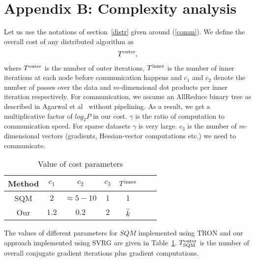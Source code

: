 \def\C{C}
\def\Ccomp{C^{\rm Comp}}
\def\Ccomm{C^{\rm Comm}}
\def\Csqm{C_{\rm SQM}}
\def\Csvrg{C_{\rm SVRG}}
\def\Ccompsqm{C^{\rm Comp}_{\rm SQM}}
\def\Ccommsqm{C^{\rm Comm}_{\rm SQM}}
\def\Ccompsvrg{C^{\rm Comp}_{\rm SVRG}}
\def\Ccommsvrg{C^{\rm Comm}_{\rm SVRG}}
\def\Tout{T^{\rm outer}}
\def\Tin{T^{\rm inner}}
\def\Toutsqm{T^{\rm outer}_{\rm SQM}}
\def\Toutsvrg{T^{\rm outer}_{\rm SVRG}}

\section{Appendix B: Complexity analysis}
\label{proofs}
Let us use the notations of section~\ref{distr} given around (\ref{comm}). We define the overall cost of any distributed algorithm as
\begin{eqnarray}
[(c_1\frac{nz}{p} + c_2m)\Tin + c_3 \gamma m \log_2 P]\Tout,
\label{costanal}
\end{eqnarray}
where $\Tout$ is the number of outer iterations, $\Tin$ is the number of inner iterations at each node before communication happens and  $c_1$ and $c_2$ denote the number of passes over the data and $m$-dimensional dot products per inner iteration respectively. For communication, we assume an AllReduce binary tree as described in Agarwal et al~ without pipelining. As a result, we get a multiplicative factor of $log_2 P$ in our cost. $\gamma$ is the ratio of computation to communication speed. For sparse datasets $\gamma$ is very large. $c_3$ is the number of $m$-dimensional vectors (gradients, Hessian-vector computations etc.) we need to communicate.

\begin{table}[ht]
\caption{Value of cost parameters} %
\centering %
\begin{tabular}{c c c c c c c} %
\hline\hline %
Method & $c_1$ & $c_2$ & $c_3$ & $\Tin$ \\ %
\hline
SQM & $2$ & $\approx 5-10$ & $1$ & $1$ \\
Our & $1.2$ & $0.2$ & $2$ & $\hat{k}$ \\
\hline
\end{tabular}
\label{tab:params}
\end{table}

The values of different parameters for $SQM$ implemented using TRON and our approach implemented using SVRG are given in Table~\ref{tab:params}. $\Toutsqm$ is the number of overall conjugate gradient iterations plus gradient computations.


